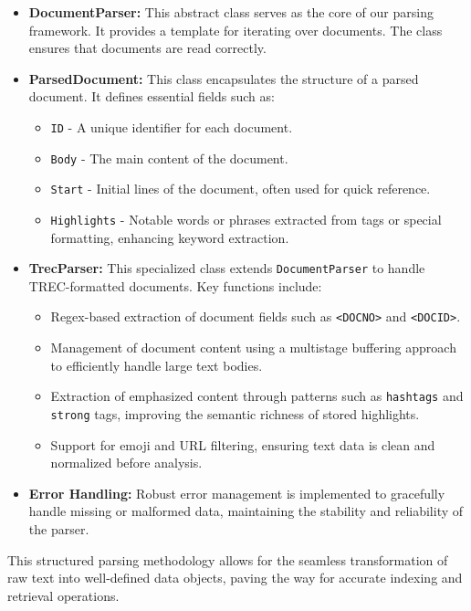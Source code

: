 \begin{itemize}

\item \textbf{DocumentParser:} This abstract class serves as the core of our parsing framework. It provides a template for iterating over documents. The class ensures that documents are read correctly.

\item \textbf{ParsedDocument:} This class encapsulates the structure of a parsed document. It defines essential fields such as:
  \begin{itemize}
    \item \texttt{ID} - A unique identifier for each document.
    \item \texttt{Body} - The main content of the document.
    \item \texttt{Start} - Initial lines of the document, often used for quick reference.
    \item \texttt{Highlights} - Notable words or phrases extracted from tags or special formatting, enhancing keyword extraction.
  \end{itemize}

\item \textbf{TrecParser:} This specialized class extends \texttt{DocumentParser} to handle TREC-formatted documents. Key functions include:
  \begin{itemize}
    \item Regex-based extraction of document fields such as \texttt{<DOCNO>} and \texttt{<DOCID>}.
    \item Management of document content using a multistage buffering approach to efficiently handle large text bodies.
    \item Extraction of emphasized content through patterns such as \texttt{hashtags} and \texttt{strong} tags, improving the semantic richness of stored highlights.
    \item Support for emoji and URL filtering, ensuring text data is clean and normalized before analysis.
  \end{itemize}

\item \textbf{Error Handling:} Robust error management is implemented to gracefully handle missing or malformed data, maintaining the stability and reliability of the parser.

\end{itemize}

This structured parsing methodology allows for the seamless transformation of raw text into well-defined data objects, paving the way for accurate indexing and retrieval operations.

